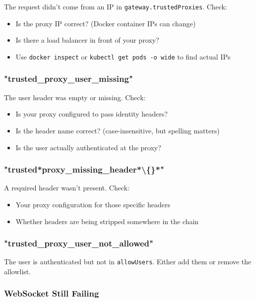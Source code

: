 The request didn't come from an IP in \texttt{gateway.trustedProxies}. Check:

\begin{itemize}
  \item Is the proxy IP correct? (Docker container IPs can change)
  \item Is there a load balancer in front of your proxy?
  \item Use \texttt{docker inspect} or \texttt{kubectl get pods -o wide} to find actual IPs
\end{itemize}


\subsubsection{"trusted\_proxy\_user\_missing"}


The user header was empty or missing. Check:

\begin{itemize}
  \item Is your proxy configured to pass identity headers?
  \item Is the header name correct? (case-insensitive, but spelling matters)
  \item Is the user actually authenticated at the proxy?
\end{itemize}


\subsubsection{"trusted*proxy\_missing\_header*\textbackslash\{\}*"}


A required header wasn't present. Check:

\begin{itemize}
  \item Your proxy configuration for those specific headers
  \item Whether headers are being stripped somewhere in the chain
\end{itemize}


\subsubsection{"trusted\_proxy\_user\_not\_allowed"}


The user is authenticated but not in \texttt{allowUsers}. Either add them or remove the allowlist.

\subsubsection{WebSocket Still Failing}


